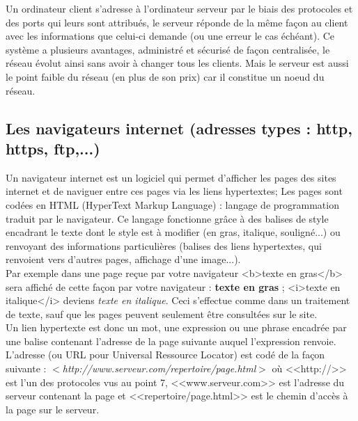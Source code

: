 \documentclass[11pt,twoside,a4paper]{article}
\begin{document}
			Un ordinateur client s'adresse {\`a} l'ordinateur serveur par le biais des protocoles et des ports qui leurs sont attribu{\'e}s, le serveur r{\'e}ponde de la m{\^e}me fa\c{c}on au client avec les informations que celui-ci demande (ou une erreur le cas {\'e}ch{\'e}ant). Ce syst{\`e}me a plusieurs avantages, administr{\'e} et s{\'e}curis{\'e} de fa\c{c}on centralis{\'e}e, le r{\'e}seau {\'e}volut ainsi sans avoir {\`a} changer tous les clients. Mais le serveur est aussi le point faible du r{\'e}seau (en plus de son prix) car il constitue un noeud du r{\'e}seau. ~\\

	\subsection{Les navigateurs internet (adresses types : http, https, ftp,...)}

			Un navigateur internet est un logiciel qui permet d'afficher les pages des sites internet et de naviguer entre ces pages via les liens hypertextes; Les pages sont cod{\'e}es en HTML (HyperText Markup Language) : langage de programmation traduit par le navigateur. Ce langage fonctionne gr{\^a}ce {\`a} des balises de style encadrant le texte dont le style est {\`a} modifier (en gras, italique, soulign{\'e}...) ou renvoyant des informations particuli{\`e}res (balises des liens hypertextes, qui renvoient vers d'autres pages, affichage d'une image...). ~\\

		Par exemple dans une page re\c{c}ue par votre navigateur <b>texte en gras</b> sera affich{\'e} de cette fa\c{c}on par votre navigateur : \textbf{texte en gras} ; <i>texte en italique</i> deviens \textit{texte en italique}. Ceci s'effectue comme dans un traitement de texte, sauf que les pages peuvent seulement {\^e}tre consult{\'e}es sur le site. ~\\

		Un lien hypertexte est donc un mot, une expression ou une phrase encadr{\'e}e par une balise contenant l'adresse de la page suivante auquel l'expression renvoie. L'adresse (ou URL pour Universal Ressource Locator) est cod{\'e} de la fa\c{c}on suivante : $<$\emph{http://www.serveur.com/repertoire/page.html}$>$ o{\`u} <<http://>> est l'un des protocoles vus au point 7, <<www.serveur.com>> est l'adresse du serveur contenant la page et <<repertoire/page.html>> est le chemin d'acc{\`e}s {\`a} la page sur le serveur. ~\\
\end{document}
